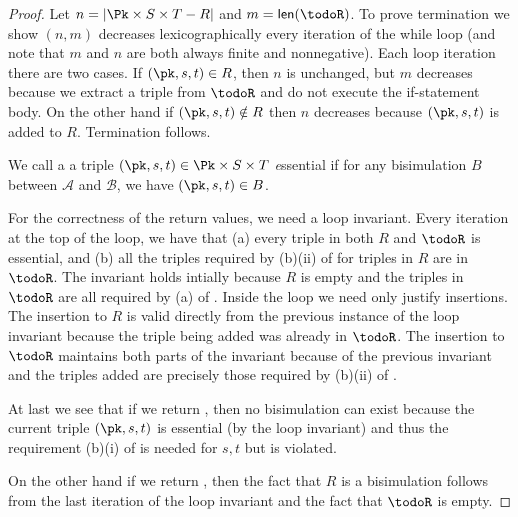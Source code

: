 \bisimnaivetermination*
\begin{proof}
  Let $n = |\Pk\times S\times T - R|$ and $m = \textsf{len}(\todoR)$. To prove termination we show
  $(n, m)$ decreases lexicographically every iteration of the while loop (and
  note that $m$ and $n$ are both always finite and nonnegative). Each loop iteration there are
  two cases.
  If $(\pk, s, t)\in R$, then $n$ is unchanged, but $m$ decreases because
  we extract a triple from $\todoR$ and do not execute the if-statement body. On the other
  hand if $(\pk, s, t)\notin R$ then $n$ decreases because $(\pk, s, t)$ is
  added to $R$.
  Termination follows.

  We call a a triple $(\pk, s, t) \in \Pk\times S\times T$ \emph essential if
  for any bisimulation $B$ between $\mathcal A$ and $\mathcal B$, we have $(\pk, s, t) \in B$.

  For the correctness of the return values, we need a loop invariant. Every
  iteration at the top of the loop, we have that (a) every triple in both $R$ and $\todoR$
  is essential, and (b) all the triples required by (b)(ii) of  for triples in $R$
  are in $\todoR$.
  The invariant holds intially because $R$ is empty and the triples in $\todoR$ are all
  required by (a) of .
  Inside the loop we need only justify insertions.
  The insertion to $R$ is valid directly from the previous instance of the loop invariant because
  the triple being added was already in $\todoR$. The insertion to $\todoR$ maintains both parts of
  the invariant because of the previous invariant and the triples added are precisely those
  required by (b)(ii) of .

  At last we see that if we return \false, then no bisimulation can exist because the current triple
  $(\pk, s, t)$ is essential (by the loop invariant) and thus the requirement (b)(i) of 
  is needed for $s,t$ but is violated.

  On the other hand if we return \true, then the fact that $R$ is a bisimulation
  follows from the last iteration of the loop invariant and the fact that
  $\todoR$ is empty.
\end{proof}

